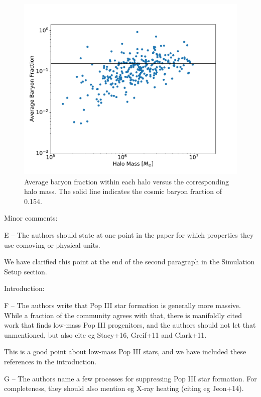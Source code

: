 \documentclass[11pt]{article}
\newenvironment{referee}[1][]{%
    \ignorespaces%
    \begin{mdframed}[style=myquotestyle,#1]%
}{%
    \end{mdframed}%
    \ignorespacesafterend%
}%
\begin{document}
\begin{figure}[ht!]
  \centering
  \includegraphics[keepaspectratio=true, scale=0.4]{images/avg_baryon_fraction.pdf}
  \caption{\label{fig:avg_baryon_fraction} Average baryon fraction within each halo versus the corresponding halo mass. The solid line indicates the cosmic baryon fraction of 0.154.}
\end{figure}

\begin{referee}
Minor comments:

E -- The authors should state at one point in the paper for which properties they use comoving or physical units.
\end{referee}
We have clarified this point at the end of the second paragraph in the Simulation Setup section.

\begin{referee}
Introduction:

F -- The authors write that Pop III star formation is generally more massive. While a fraction of the community agrees with that, there is manifoldly cited work that finds low-mass Pop III progenitors, and the authors should not let that unmentioned, but also cite eg Stacy+16, Greif+11 and Clark+11.
\end{referee}

This is a good point about low-mass Pop III stars, and we have included these references in the introduction.

\begin{referee}
G -- The authors name a few processes for suppressing Pop III star formation. For completeness, they should also mention eg X-ray heating (citing eg Jeon+14).
\end{referee}
\end{document}
